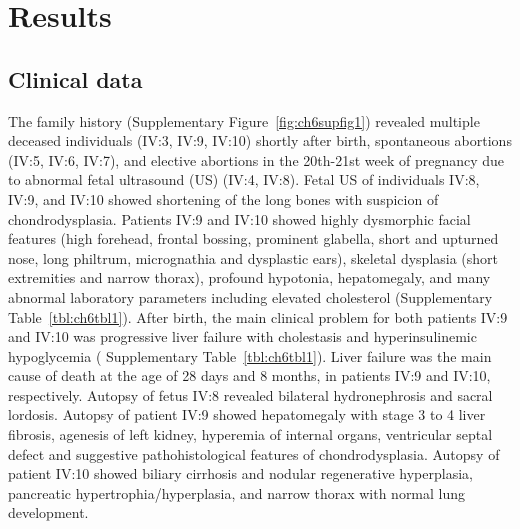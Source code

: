 \section{Results}

\subsection{Clinical data}

The family history (Supplementary Figure~\ref{fig:ch6supfig1}) revealed multiple deceased individuals (IV:3, IV:9, IV:10) shortly after birth, spontaneous abortions (IV:5, IV:6, IV:7), and elective abortions in the 20th-21st week of pregnancy due to abnormal fetal ultrasound (US) (IV:4, IV:8). Fetal US of individuals IV:8, IV:9, and IV:10 showed shortening of the long bones with suspicion of chondrodysplasia. Patients IV:9 and IV:10 showed highly dysmorphic facial features (high forehead, frontal bossing, prominent glabella, short and upturned nose, long philtrum, micrognathia and dysplastic ears), skeletal dysplasia (short extremities and narrow thorax), profound hypotonia, hepatomegaly, and many abnormal laboratory parameters including elevated cholesterol (Supplementary Table~\ref{tbl:ch6tbl1}). After birth, the main clinical problem for both patients IV:9 and IV:10 was progressive liver failure with cholestasis and hyperinsulinemic hypoglycemia ( Supplementary Table~\ref{tbl:ch6tbl1}). Liver failure was the main cause of death at the age of 28 days and 8 months, in patients IV:9 and IV:10, respectively. Autopsy of fetus IV:8 revealed bilateral hydronephrosis and sacral lordosis. Autopsy of patient IV:9 showed hepatomegaly with stage 3 to 4 liver fibrosis, agenesis of left kidney, hyperemia of internal organs, ventricular septal defect and suggestive pathohistological features of chondrodysplasia. Autopsy of patient IV:10 showed biliary cirrhosis and nodular regenerative hyperplasia, pancreatic hypertrophia/hyperplasia, and narrow thorax with normal lung development.

